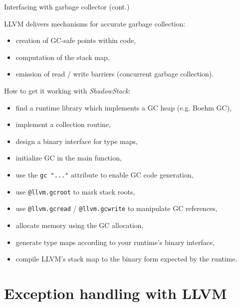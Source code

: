 \documentclass[8pt]{beamer}
\begin{document}
\begin{frame}[fragile]{Interfacing with garbage collector (cont.)}
  \begin{block}{LLVM delivers mechanisms for accurate garbage collection:}
    \begin{itemize}
      \item creation of GC-safe points within code,
      \item computation of the stack map,
      \item emission of read / write barriers (concurrent garbage collection).
    \end{itemize}
  \end{block}

  \begin{block}{How to get it working with \textit{ShadowStack}:}
    \begin{itemize}
      \item find a runtime library which implements a GC heap (e.g. Boehm GC),
      \item implement a collection routine,
      \item design a binary interface for type maps,
      \item initialize GC in the main function,
      \item use the \verb+gc "..."+ attribute to enable GC code generation,
      \item use \verb+@llvm.gcroot+ to mark stack roots,
      \item use \verb+@llvm.gcread+ / \verb+@llvm.gcwrite+ to manipulate GC
        references,
      \item allocate memory using the GC allocation,
      \item generate type maps according to your runtime's binary interface,
      \item compile LLVM's stack map to the binary form expected by the
        runtime.
    \end{itemize}
  \end{block}
\end{frame}

\section[Exception handling]{Exception handling with LLVM}
\subsection*{}
\end{document}
